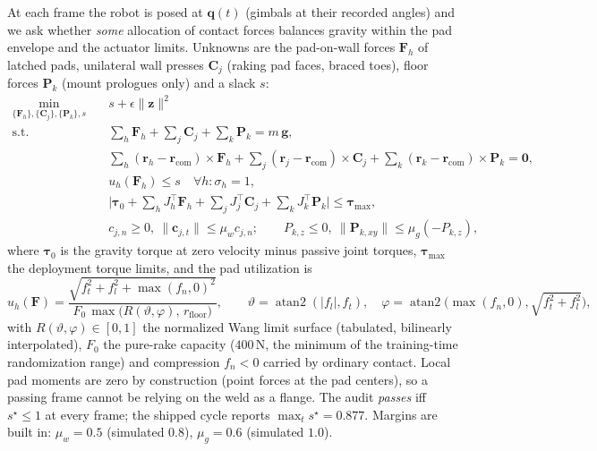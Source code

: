 \documentclass[11pt]{article}
\DeclareMathOperator{\atan}{atan2}
\begin{document}
At each frame the robot is posed at $\bm q(t)$ (gimbals at their recorded
angles) and we ask whether \emph{some} allocation of contact forces balances
gravity within the pad envelope and the actuator limits. Unknowns are the
pad-on-wall forces $\bm F_h$ of latched pads, unilateral wall presses
$\bm C_j$ (raking pad faces, braced toes), floor forces $\bm P_k$ (mount
prologues only) and a slack $s$:
\begin{equation}
\begin{aligned}
  \min_{\{\bm F_h\},\{\bm C_j\},\{\bm P_k\},s}\quad & s+\epsilon\|\bm z\|^2\\
  \text{s.t.}\quad
  & \textstyle\sum_h\bm F_h+\sum_j\bm C_j+\sum_k\bm P_k=m\,\bm g,\\
  & \textstyle\sum_h(\bm r_h-\bm r_{\mathrm{com}})\times\bm F_h
    +\sum_j(\bm r_j-\bm r_{\mathrm{com}})\times\bm C_j
    +\sum_k(\bm r_k-\bm r_{\mathrm{com}})\times\bm P_k=\bm 0,\\
  & u_h(\bm F_h)\le s\quad\forall h:\sigma_h=1,\\
  & \bigl|\bm\tau_0+\textstyle\sum_h J_h^\top\bm F_h+\sum_j J_j^\top\bm C_j+\sum_k J_k^\top\bm P_k\bigr|
    \le\bm\tau_{\max},\\
  & c_{j,n}\ge0,\ \|\bm c_{j,t}\|\le\mu_w c_{j,n};\qquad
    P_{k,z}\le0,\ \|\bm P_{k,xy}\|\le\mu_g(-P_{k,z}),
\end{aligned}
\label{eq:audit}
\end{equation}
where $\bm\tau_0$ is the gravity torque at zero velocity minus passive joint
torques, $\bm\tau_{\max}$ the deployment torque limits, and the pad
utilization is
\begin{equation}
  u_h(\bm F)=\frac{\sqrt{f_t^2+f_l^2+\max(f_n,0)^2}}
                  {F_0\,\max\!\bigl(R(\vartheta,\varphi),\,r_{\mathrm{floor}}\bigr)},
  \qquad
  \vartheta=\atan(|f_l|,f_t),\quad
  \varphi=\atan\!\bigl(\max(f_n,0),\sqrt{f_t^2+f_l^2}\bigr),
  \label{eq:util}
\end{equation}
with $R(\vartheta,\varphi)\in[0,1]$ the normalized Wang limit surface
(tabulated, bilinearly interpolated), $F_0$ the pure-rake capacity
($400$\,N, the minimum of the training-time randomization range) and
compression $f_n<0$ carried by ordinary contact. Local pad moments are zero
by construction (point forces at the pad centers), so a passing frame cannot
be relying on the weld as a flange. The audit \emph{passes} iff $s^\star\le1$
at every frame; the shipped cycle reports $\max_t s^\star=0.877$. Margins are
built in: $\mu_w=0.5$ (simulated $0.8$), $\mu_g=0.6$ (simulated $1.0$).
\end{document}
